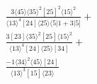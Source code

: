 \documentclass[varwidth, border=5pt]{standalone}
\begin{document}
\begin{my}
$\begin{gathered}
\scriptscriptstyle\frac{3⟨45⟩⟨35⟩^2[25]^2⟨15⟩^2}{⟨13⟩^4[24]⟨25⟩⟨5|1+3|5]}+\\
\scriptscriptstyle\frac{3[23]⟨35⟩^2[25]⟨15⟩^2}{⟨13⟩^4[24]⟨25⟩[34]}+\\
\scriptscriptstyle\frac{-1⟨34⟩^2⟨45⟩[24]}{⟨13⟩^3[15]⟨23⟩}\phantom{+}
\end{gathered}$
\end{my}
\end{document}
